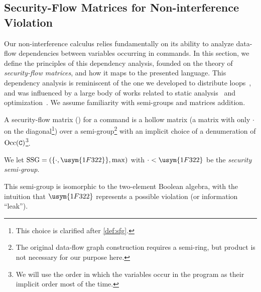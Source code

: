 \documentclass[conference]{IEEEtran}
\newcommand{\vi}{\usym{1F322}} %
\newcommand{\nv}{\cdot} %
\begin{document}
\subsection{Security-Flow Matrices for Non-interference Violation}
\label{subsec:sfg}

Our non-interference calculus relies fundamentally on its ability to analyze data-flow dependencies between variables occurring in commands.
In this section, we define the principles of this dependency analysis, founded on the theory of \emph{security-flow matrices}, and how it maps to the presented language.
This dependency analysis is reminiscent of the one we developed to distribute loops~\cite{Aubert2023a}, and was influenced by a large body of works related to static analysis~\cite{Abel20002,Kristiansen2005b,Lee2001,Aubert2022b,Jones2009} and optimization~\cite{Moyen2017}.
We assume %
familiarity with semi-groups and matrices addition. %

A security-flow matrix (\SFM) for a %
 command %
 is a hollow matrix (\ie a matrix with only $\nv$ on the diagonal\footnote{This choice is clarified after \autoref{def:sfg}.}) over a semi-group\footnote{The original data-flow graph construction requires a semi-ring, but product is not necessary for our purpose here.} with an implicit choice of a denumeration of \(\operatorname{Occ}(\mathtt{C})\)\footnote{We will use the order in which the variables occur in the program as their implicit order most of the time.\label{footnote:order-variables}}.

\begin{definition}
	We let \(\SSG=(\{\nv, \vi\}, \max)\) with \(\nv < \vi\) be the \emph{security semi-group}.	
\end{definition}

This semi-group is isomorphic to the two-element Boolean algebra, with the intuition that \(\vi\) represents a possible violation (or information \enquote{leak}).
\end{document}
